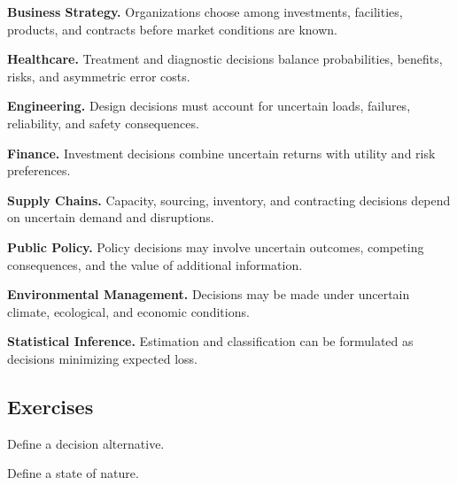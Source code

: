 \begin{applicationbox}

\textbf{Business Strategy.}
Organizations choose among investments, facilities, products, and
contracts before market conditions are known.

\medskip

\textbf{Healthcare.}
Treatment and diagnostic decisions balance probabilities, benefits,
risks, and asymmetric error costs.

\medskip

\textbf{Engineering.}
Design decisions must account for uncertain loads, failures, reliability,
and safety consequences.

\medskip

\textbf{Finance.}
Investment decisions combine uncertain returns with utility and risk
preferences.

\medskip

\textbf{Supply Chains.}
Capacity, sourcing, inventory, and contracting decisions depend on
uncertain demand and disruptions.

\medskip

\textbf{Public Policy.}
Policy decisions may involve uncertain outcomes, competing consequences,
and the value of additional information.

\medskip

\textbf{Environmental Management.}
Decisions may be made under uncertain climate, ecological, and economic
conditions.

\medskip

\textbf{Statistical Inference.}
Estimation and classification can be formulated as decisions minimizing
expected loss.

\end{applicationbox}

\subsection{Exercises}
\label{subsec:decision-theory-exercises}

\begin{exercise}[1]
Define a decision alternative.
\end{exercise}

\begin{exercise}[1]
Define a state of nature.
\end{exercise}

